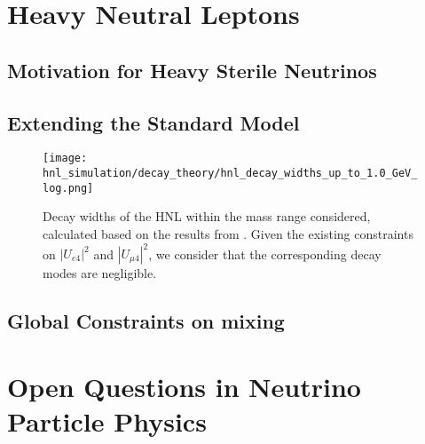 \section{Heavy Neutral Leptons}

\subsection{Motivation for Heavy Sterile Neutrinos}

\subsection{Extending the Standard Model}


\begin{figure}
    \texttt{[image: hnl\_simulation/decay\_theory/hnl\_decay\_widths\_up\_to\_1.0\_GeV\_log.png]}
    \caption{Decay widths of the HNL within the mass range considered, calculated based on the results from \cite{Coloma:2020lgy}. Given the existing constraints on $|U_{e4}|^{2}$ and $|U_{\mu4}|^{2}$, we consider that the corresponding decay modes are negligible.}
\end{figure}


\subsection{Global Constraints on  mixing}


\section{Open Questions in Neutrino Particle Physics}
